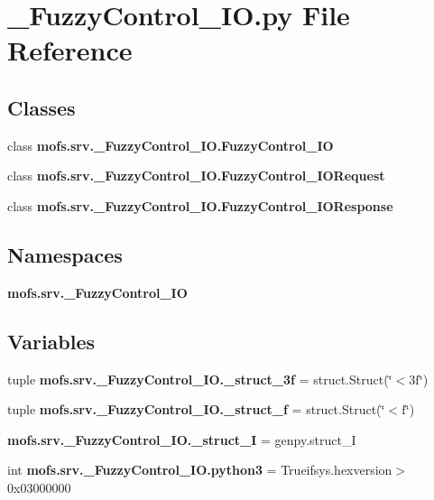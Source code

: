 \section{\-\_\-\-Fuzzy\-Control\-\_\-\-I\-O.\-py File Reference}
\label{__FuzzyControl__IO_8py}
\subsection*{Classes}
\begin{DoxyCompactItemize}
\item 
class {\bf mofs.\-srv.\-\_\-\-Fuzzy\-Control\-\_\-\-I\-O.\-Fuzzy\-Control\-\_\-\-I\-O}
\item 
class {\bf mofs.\-srv.\-\_\-\-Fuzzy\-Control\-\_\-\-I\-O.\-Fuzzy\-Control\-\_\-\-I\-O\-Request}
\item 
class {\bf mofs.\-srv.\-\_\-\-Fuzzy\-Control\-\_\-\-I\-O.\-Fuzzy\-Control\-\_\-\-I\-O\-Response}
\end{DoxyCompactItemize}
\subsection*{Namespaces}
\begin{DoxyCompactItemize}
\item 
{\bf mofs.\-srv.\-\_\-\-Fuzzy\-Control\-\_\-\-I\-O}
\end{DoxyCompactItemize}
\subsection*{Variables}
\begin{DoxyCompactItemize}
\item 
tuple {\bf mofs.\-srv.\-\_\-\-Fuzzy\-Control\-\_\-\-I\-O.\-\_\-struct\-\_\-3f} = struct.\-Struct(\char`\"{}$<$3f\char`\"{})
\item 
tuple {\bf mofs.\-srv.\-\_\-\-Fuzzy\-Control\-\_\-\-I\-O.\-\_\-struct\-\_\-f} = struct.\-Struct(\char`\"{}$<$f\char`\"{})
\item 
{\bf mofs.\-srv.\-\_\-\-Fuzzy\-Control\-\_\-\-I\-O.\-\_\-struct\-\_\-\-I} = genpy.\-struct\-\_\-\-I
\item 
int {\bf mofs.\-srv.\-\_\-\-Fuzzy\-Control\-\_\-\-I\-O.\-python3} = Trueifsys.\-hexversion$>$0x03000000
\end{DoxyCompactItemize}
